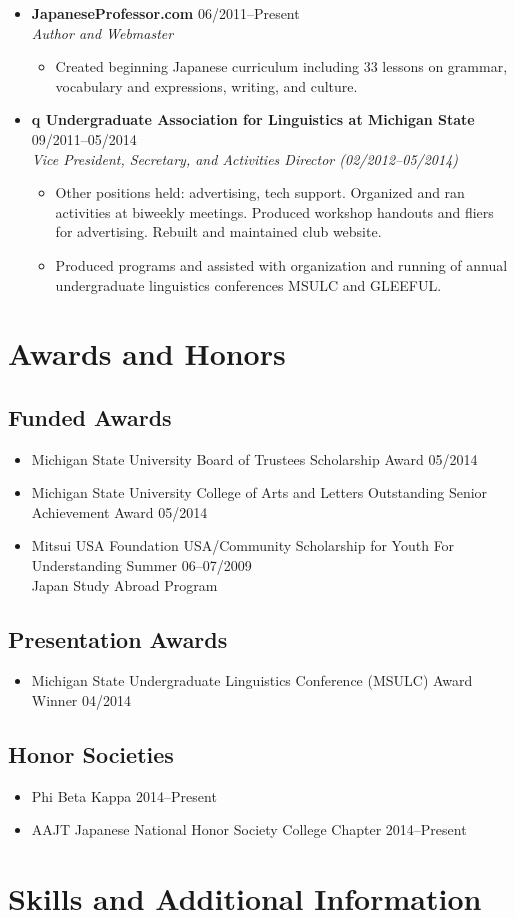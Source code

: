 \documentclass[10pt,oneside]{article}
\newcommand{\ressection}[1]{
	\vspace{-12pt}
	\section*{#1}
}
\newcommand{\ressubsection}[1]{
	\subsection*{#1}
	\vspace{-4pt}
}
\newcommand{\resitem}[2]{
	\item #1 \hfill #2
}
\newcommand{\resbigitem}[4]{
	\item
	\textbf{#1} \hfill #2 \\
	\textit{#3} \hfill \textit{#4}
}
\begin{document}
\begin{itemize}
	\resbigitem
		{JapaneseProfessor.com}
		{06/2011--Present}
		{Author and Webmaster}
		{}
	\begin{itemize}
		\item{Created beginning Japanese curriculum including 33 lessons on grammar, vocabulary and expressions, writing, and culture.}
	\end{itemize}
	
	\resbigitem
		{q Undergraduate Association for Linguistics at Michigan State}
		{09/2011--05/2014}
		{Vice President, Secretary, and Activities Director (02/2012--05/2014)}
		{}
	\begin{itemize}
		\item{Other positions held: advertising, tech support. Organized and ran activities at biweekly meetings. Produced workshop handouts and fliers for advertising. Rebuilt and maintained club website.}
		\item{Produced programs and assisted with organization and running of annual undergraduate linguistics conferences MSULC and GLEEFUL. }
	\end{itemize}
\end{itemize}


\ressection{Awards and Honors}
	
	\ressubsection{Funded Awards}
	\begin{itemize}
		\resitem{Michigan State University Board of Trustees Scholarship Award}{05/2014}
		\resitem{Michigan State University College of Arts and Letters Outstanding Senior Achievement Award}{05/2014}
		\resitem{Mitsui USA Foundation USA/Community Scholarship for Youth For Understanding Summer}{06--07/2009 \\ Japan Study Abroad Program}
	\end{itemize}
	
	\ressubsection{Presentation Awards}
	\begin{itemize}
		\resitem{Michigan State Undergraduate Linguistics Conference (MSULC) Award Winner}{04/2014}
	\end{itemize}
	
	\ressubsection{Honor Societies}
	\begin{itemize}
		\resitem{Phi Beta Kappa}{2014--Present}
		\resitem{AAJT Japanese National Honor Society College Chapter}{2014--Present}
	\end{itemize}


\ressection{Skills and Additional Information}
\end{document}
